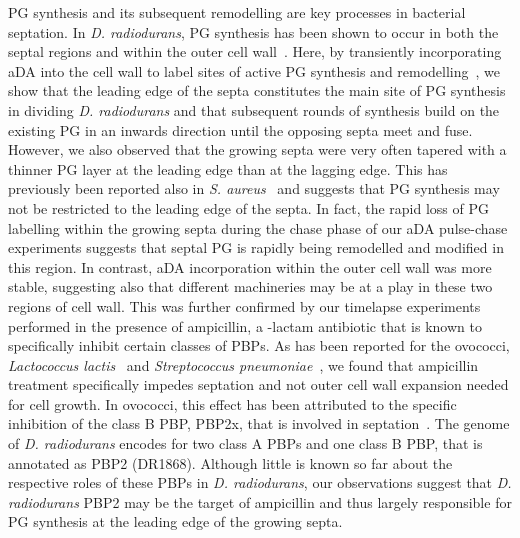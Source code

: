 PG synthesis and its subsequent remodelling are key processes in bacterial septation.
In \textit{D. radiodurans}, PG synthesis has been shown to occur in both the septal regions and within the outer cell wall~\cite{flochCellMorphologyNucleoid2019}.
Here, by transiently incorporating aDA into the cell wall to label sites of active PG synthesis and remodelling~\cite{trouveNanoscaleDynamicsPeptidoglycan2021,lundMolecularCoordinationStaphylococcus2018}, we show that the leading edge of the septa constitutes the main site of PG synthesis in dividing \textit{D. radiodurans} and that subsequent rounds of synthesis build on the existing PG in an inwards direction until the opposing septa meet and fuse.
However, we also observed that the growing septa were very often tapered with a thinner PG layer at the leading edge than at the lagging edge.
This has previously been reported also in \textit{S. aureus}~\cite{giesbrechtStaphylococcalCellWall1998,matiasCryoelectronMicroscopyCell2007,lundMolecularCoordinationStaphylococcus2018} and suggests that PG synthesis may not be restricted to the leading edge of the septa.
In fact, the rapid loss of PG labelling within the growing septa during the chase phase of our aDA pulse-chase experiments suggests that septal PG is rapidly being remodelled and modified in this region.
In contrast, aDA incorporation within the outer cell wall was more stable, suggesting also that different machineries may be at a play in these two regions of cell wall.
This was further confirmed by our timelapse experiments performed in the presence of ampicillin, a \beta-lactam antibiotic that is known to specifically inhibit certain classes of PBPs.
As has been reported for the ovococci, \textit{Lactococcus lactis}~\cite{perez-nunezNewMorphogenesisPathway2011} and \textit{Streptococcus pneumoniae}~\cite{landRequirementEssentialPbp2x2013,kocaogluProfilingVlactamSelectivity2015}, we found that ampicillin treatment specifically impedes septation and not outer cell wall expansion needed for cell growth.
In ovococci, this effect has been attributed to the specific inhibition of the class B PBP, PBP2x, that is involved in septation~\cite{perez-nunezNewMorphogenesisPathway2011,landRequirementEssentialPbp2x2013,zapunPenicillinbindingProteinsBetalactam2008}.
The genome of \textit{D. radiodurans} encodes for two class A PBPs and one class B PBP, that is annotated as PBP2 (DR1868).
Although little is known so far about the respective roles of these PBPs in \textit{D. radiodurans}, our observations suggest that \textit{D. radiodurans} PBP2 may be the target of ampicillin and thus largely responsible for PG synthesis at the leading edge of the growing septa.

